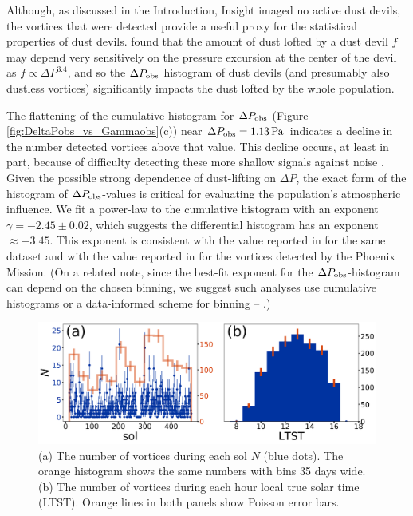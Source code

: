 \documentclass{aastex63}
\begin{document}
Although, as discussed in the Introduction, Insight imaged no active dust devils, the vortices that were detected provide a useful proxy for the statistical properties of dust devils. \citet{2010Icar..206..306N} found that the amount of dust lofted by a dust devil $f$ may depend very sensitively on the pressure excursion at the center of the devil as $f \propto \Delta P^{3.4}$, and so the $\Delta P_{\rm obs}$ histogram of dust devils (and presumably also dustless vortices) significantly impacts the dust lofted by the whole population. 

The flattening of the cumulative histogram for $\Delta P_{\rm obs}$ (Figure \ref{fig:DeltaPobs_vs_Gammaobs}(c)) near $\Delta P_{\rm obs} = 1.13\,{\rm Pa}$ indicates a decline in the number detected vortices above that value. This decline occurs, at least in part, because of difficulty detecting these more shallow signals against noise  \citep{2018Icar..299..166J}. Given the possible strong dependence of dust-lifting on $\Delta P$, the exact form of the histogram of $\Delta P_{\rm obs}$-values is critical for evaluating the population's atmospheric influence. We fit a power-law to the cumulative histogram with an exponent $\gamma = -2.45\pm0.02$, which suggests the differential histogram has an exponent $\approx -3.45$. This exponent is consistent with the value reported in  \citet{2020arXiv200501134S} for the same dataset and with the value reported in \citet{2018Icar..299..166J} for the vortices detected by the Phoenix Mission. (On a related note, since the best-fit exponent for the $\Delta P_{\rm obs}$-histogram can depend on the chosen binning, we suggest such analyses use cumulative histograms or a data-informed scheme for binning -- \citealp{2016SSRv..203..277L}.)

\begin{figure}
    \centering
    \includegraphics[width=\textwidth]{figures/sol_and_t0_histograms.png}
    \caption{(a) The number of vortices during each sol $N$ (blue dots). The orange histogram shows the same numbers with bins 35 days wide. (b) The number of vortices during each hour local true solar time (LTST). Orange lines in both panels show Poisson error bars.}
    \label{fig:sol_and_t0_histograms}
\end{figure}
\end{document}
